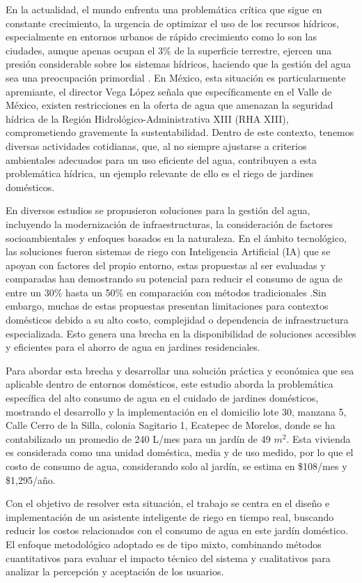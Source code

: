 \documentclass[pdflatex,sn-mathphys-num]{sn-jnl}%
\theoremstyle{thmstyleone}%
\theoremstyle{thmstyletwo}%
\theoremstyle{thmstylethree}%
\begin{document}
\begin{multicols}{2}
\justifying
En la actualidad, el mundo enfrenta una problemática crítica que sigue en constante crecimiento, la urgencia de optimizar el uso de los recursos hídricos, especialmente en entornos urbanos de rápido crecimiento como lo son las ciudades, aunque apenas ocupan el 3\% de la superficie terrestre, ejercen una presión considerable sobre los sistemas hídricos, haciendo que la gestión del agua sea una preocupación primordial \cite{ref1}. En México, esta situación es particularmente apremiante, el director Vega López señala que específicamente en el Valle de México, existen restricciones en la oferta de agua que amenazan la seguridad hídrica de la Región Hidrológico-Administrativa XIII (RHA XIII), comprometiendo gravemente la sustentabilidad\cite{ref2}. Dentro de este contexto, tenemos diversas actividades cotidianas, que, al no siempre ajustarse a criterios ambientales adecuados para un uso eficiente del agua, contribuyen a esta problemática hídrica, un ejemplo relevante de ello es el riego de jardines domésticos.

En diversos estudios se propusieron soluciones para la gestión del agua, incluyendo la modernización de infraestructuras, la consideración de factores socioambientales y enfoques basados en la naturaleza. En el ámbito tecnológico, las soluciones fueron sistemas de riego con Inteligencia Artificial (IA) que se apoyan con factores del propio entorno, estas propuestas al ser evaluadas y comparadas han demostrando su potencial para reducir el consumo de agua de entre un 30\% hasta un 50\% en comparación con métodos tradicionales \cite{ref3}.Sin embargo, muchas de estas propuestas presentan limitaciones para contextos domésticos debido a su alto costo, complejidad o dependencia de infraestructura especializada. Esto genera una brecha en la disponibilidad de soluciones accesibles y eficientes para el ahorro de agua en jardines residenciales.

Para abordar esta brecha y desarrollar una solución práctica y económica que sea aplicable dentro de entornos domésticos, este estudio aborda la problemática específica del alto consumo de agua en el cuidado de jardines domésticos, mostrando el desarrollo y la implementación en el domicilio lote 30, manzana 5, Calle Cerro de la Silla, colonia Sagitario 1, Ecatepec de Morelos, donde se ha contabilizado un promedio de 240 L/mes para un jardín de 49 $m^2$. Esta vivienda es considerada como una unidad doméstica, media y de uso medido, por lo que el costo de consumo de agua, considerando solo al jardín, se estima en \$108/mes y \$1,295/año\cite{ref4}.

Con el objetivo de resolver esta situación, el trabajo se centra en el diseño e implementación de un asistente inteligente de riego en tiempo real, buscando reducir los costos relacionados con el consumo de agua en este jardín doméstico. El enfoque metodológico adoptado es de tipo mixto, combinando métodos cuantitativos para evaluar el impacto técnico del sistema y cualitativos para analizar la percepción y aceptación de los usuarios.
\end{multicols}
\end{document}
